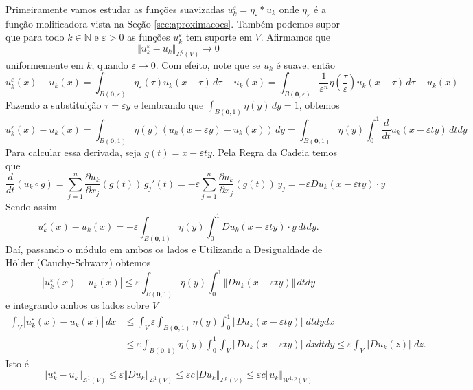 \documentclass[a4paper, 11pt]{book}
\theoremstyle{definition}
\newcommand{\bN}{\mathbb{N}}
\newcommand{\bz}{\mathbf{0}}
\newcommand{\cL}{\mathcal{L}}
\newcommand{\cW}{\mathcal{W}}
\begin{document}
\begin{prf}
    Primeiramente vamos estudar as funções suavizadas $u_k^\varepsilon = \eta_\varepsilon * u_k$ onde $\eta_\varepsilon$ é a função molificadora vista na Seção \ref{sec:aproximacoes}. Também podemos supor que para todo $k \in \bN$ e $\varepsilon > 0$ as funções $u_k^\varepsilon$ tem suporte em $V$. Afirmamos que
    \begin{equation} \label{eq:convergenciaemlq}
        \Vert u^\varepsilon_k - u_k \Vert_{\cL^q(V)} \to 0
    \end{equation}
    uniformemente em $k$, quando $\varepsilon \to 0$.
    Com efeito, note que se $u_k$ é suave, então
    \[
        u_k^\varepsilon(x) - u_k(x) = \int_{B(\bz,\varepsilon)} \eta_\varepsilon(\tau) u_k (x - \tau) \,d\tau - u_k(x)  = \int_{B(\bz,\varepsilon)} \frac{1}{\varepsilon^n} \eta \left( \frac{\tau}{\varepsilon} \right) u_k (x - \tau) \,d\tau - u_k(x)
    \]
    Fazendo a substituição $\tau = \varepsilon y$ e lembrando que $\int_{B(\bz,1)} \eta(y) \,dy = 1$, obtemos
    \[
        u_k^\varepsilon(x) - u_k(x) = \int_{B(\bz,1)} \eta(y) \left( u_k(x - \varepsilon y) - u_k(x) \right) \,dy = \int_{B(\bz,1)} \eta(y) \int_0^1 \frac{d}{dt}u_k(x - \varepsilon t y) \,dt dy
    \]
    Para calcular essa derivada, seja $g(t) = x - \varepsilon t y$. Pela Regra da Cadeia temos que
    \[
        \frac{d}{dt} (u_k \circ g) = \sum_{j=1}^n \dfrac{\partial u_k}{\partial x_j} (g(t)) \, g_j'(t) = -\varepsilon\sum_{j=1}^{n} \dfrac{\partial u_k}{\partial x_j}(g(t)) \,y_j = -\varepsilon Du_k(x - \varepsilon ty) \cdot y
    \]
    Sendo assim
    \[
        u_k^\varepsilon(x) - u_k(x) = -\varepsilon \int_{B(\bz,1)} \eta(y) \int_0^1 Du_k(x - \varepsilon ty) \cdot y \,dtdy.
    \]
    Daí, passando o módulo em ambos os lados e Utilizando a Desigualdade de Hölder (Cauchy-Schwarz) obtemos
    \[
        |u_k^\varepsilon(x) - u_k(x)| \leqslant \varepsilon \int_{B(\bz,1)} \eta(y) \int_0^1 \Vert Du_k(x - \varepsilon ty) \Vert \,dtdy
    \]
    e integrando ambos os lados sobre $V$
    \[
        \begin{aligned}
            \int_{V} |u_k^\varepsilon(x) - u_k(x)|\,dx &\leqslant \int_{V} \varepsilon \int_{B(\bz,1)} \eta(y) \int_0^1 \Vert Du_k(x - \varepsilon ty) \Vert \,dtdydx\\
            &\leqslant \varepsilon \int_{B(\bz,1)} \eta(y) \int_0^1 \int_{V} \Vert Du_k(x - \varepsilon ty) \Vert \,dxdtdy \leqslant \varepsilon \int_{V} \Vert Du_k(z) \Vert    \,dz.
        \end{aligned}
    \]
    Isto é
    \[
        \Vert u_k^\varepsilon - u_k \Vert_{\cL^1(V)} \leqslant \varepsilon \Vert Du_k \Vert_{\cL^1(V)} \leqslant \varepsilon c \Vert Du_k \Vert_{\cL^p(V)} \leqslant \varepsilon c \Vert u_k \Vert_{\cW^{1,p}(V)}
\]
\end{prf}
\end{document}
